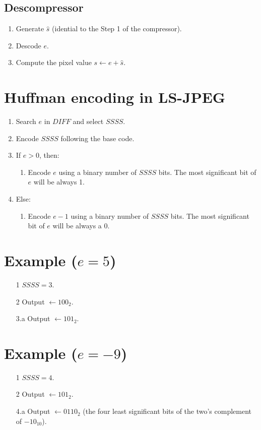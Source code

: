 \subsection{Descompressor}
\begin{enumerate}
\item Generate $\hat{s}$ (idential to the Step 1 of the compressor).
\item Descode $e$.
\item Compute the pixel value $s\leftarrow e+\hat{s}$.
\end{enumerate}

\section{Huffman encoding in LS-JPEG}
\label{sec:compresion_huffman_LS-JPEG}
\begin{enumerate}
\item Search $e$ in $DIFF$ and select $SSSS$.
\item Encode $SSSS$ following the base code.
\item If $e>0$, then:
  \begin{enumerate}
  \item Encode $e$ using a binary number of $SSSS$ bits. The most
    significant bit of $e$ will be always 1.
  \end{enumerate}
\item Else:
  \begin{enumerate}
  \item Encode $e-1$ using a binary number of $SSSS$ bits. The most
    significant bit of $e$ will be always a 0.
  \end{enumerate}
\end{enumerate}

\section*{Example ($e=5$)}
\begin{itemize}
\item [1] $SSSS=3$.
\item [2] Output $\leftarrow 100_2$.
\item [3.a] Output $\leftarrow 101_2$.
\end{itemize}

\section*{Example ($e=-9$)}
\begin{itemize}
\item [1] $SSSS=4$.
\item [2] Output $\leftarrow 101_2$.
\item [4.a] Output $\leftarrow 0110_2$ (the four least significant
  bits of the two's complement of $-10_{10}$).
\end{itemize}

